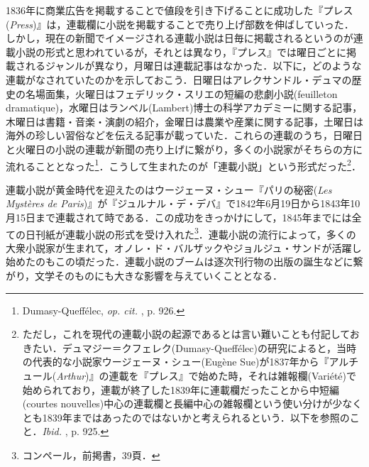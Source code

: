 1836年に商業広告を掲載することで値段を引き下げることに成功した『プレス(\emph{Press})』は，連載欄に小説を掲載することで売り上げ部数を伸ばしていった．しかし，現在の新聞でイメージされる連載小説は日毎に掲載されるというのが連載小説の形式と思われているが，それとは異なり，『プレス』では曜日ごとに掲載されるジャンルが異なり，月曜日は連載記事はなかった．以下に，どのような連載がなされていたのかを示しておこう．日曜日はアレクサンドル・デュマの歴史の名場面集，火曜日はフェデリック・スリエの短編の悲劇小説(feuilleton dramatique)，水曜日はランベル(Lambert)博士の科学アカデミーに関する記事，木曜日は書籍・音楽・演劇の紹介，金曜日は農業や産業に関する記事，土曜日は海外の珍しい習俗などを伝える記事が載っていた．これらの連載のうち，日曜日と火曜日の小説の連載が新聞の売り上げに繋がり，多くの小説家がそちらの方に流れることとなった\footnote{Dumasy-Queffélec, \emph{op. cit. }, p. 926.}．こうして生まれたのが「連載小説」という形式だった\footnote{ただし，これを現代の連載小説の起源であるとは言い難いことも付記しておきたい．デュマジー＝クフェレク(Dumasy-Queffélec)の研究によると，当時の代表的な小説家ウージェーヌ・シュー(Eugène Sue)が1837年から『アルチュール(\emph{Arthur})』の連載を『プレス』で始めた時，それは雑報欄(Variété)で始められており，連載が終了した1839年に連載欄だったことから中短編(courtes nouvelles)中心の連載欄と長編中心の雑報欄という使い分けが少なくとも1839年まではあったのではないかと考えられるという．以下を参照のこと．\emph{Ibid. }, p. 925.}．

連載小説が黄金時代を迎えたのはウージェーヌ・シュー『パリの秘密(\emph{Les Mystères de Paris})』が『ジュルナル・デ・デバ』で1842年6月19日から1843年10月15日まで連載されて時である．この成功をきっかけにして，1845年までには全ての日刊紙が連載小説の形式を受け入れた\footnote{コンペール，前掲書，39頁．}．連載小説の流行によって，多くの大衆小説家が生まれて，オノレ・ド・バルザックやジョルジュ・サンドが活躍し始めたのもこの頃だった．連載小説のブームは逐次刊行物の出版の誕生などに繋がり，文学そのものにも大きな影響を与えていくこととなる．

